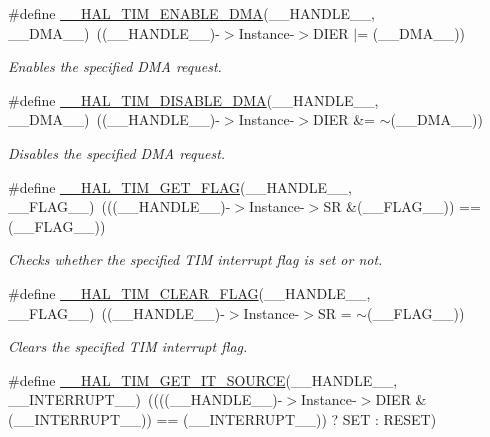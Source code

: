 \begin{DoxyCompactItemize}
\#define \hyperlink{group___t_i_m___exported___macros_gabb91ccd46cd7204c87170a1ea5b38135}{\+\_\+\+\_\+\+H\+A\+L\+\_\+\+T\+I\+M\+\_\+\+E\+N\+A\+B\+L\+E\+\_\+\+D\+MA}(\+\_\+\+\_\+\+H\+A\+N\+D\+L\+E\+\_\+\+\_\+,  \+\_\+\+\_\+\+D\+M\+A\+\_\+\+\_\+)~((\+\_\+\+\_\+\+H\+A\+N\+D\+L\+E\+\_\+\+\_\+)-\/$>$Instance-\/$>$D\+I\+ER $\vert$= (\+\_\+\+\_\+\+D\+M\+A\+\_\+\+\_\+))
\begin{DoxyCompactList}\small\item\em Enables the specified D\+MA request. \end{DoxyCompactList}\item 
\#define \hyperlink{group___t_i_m___exported___macros_ga1a6e8b19efd23fd0295802d904c4702f}{\+\_\+\+\_\+\+H\+A\+L\+\_\+\+T\+I\+M\+\_\+\+D\+I\+S\+A\+B\+L\+E\+\_\+\+D\+MA}(\+\_\+\+\_\+\+H\+A\+N\+D\+L\+E\+\_\+\+\_\+,  \+\_\+\+\_\+\+D\+M\+A\+\_\+\+\_\+)~((\+\_\+\+\_\+\+H\+A\+N\+D\+L\+E\+\_\+\+\_\+)-\/$>$Instance-\/$>$D\+I\+ER \&= $\sim$(\+\_\+\+\_\+\+D\+M\+A\+\_\+\+\_\+))
\begin{DoxyCompactList}\small\item\em Disables the specified D\+MA request. \end{DoxyCompactList}\item 
\#define \hyperlink{group___t_i_m___exported___macros_ga96d98c66ad9d85f00c148de99888ef19}{\+\_\+\+\_\+\+H\+A\+L\+\_\+\+T\+I\+M\+\_\+\+G\+E\+T\+\_\+\+F\+L\+AG}(\+\_\+\+\_\+\+H\+A\+N\+D\+L\+E\+\_\+\+\_\+,  \+\_\+\+\_\+\+F\+L\+A\+G\+\_\+\+\_\+)~(((\+\_\+\+\_\+\+H\+A\+N\+D\+L\+E\+\_\+\+\_\+)-\/$>$Instance-\/$>$SR \&(\+\_\+\+\_\+\+F\+L\+A\+G\+\_\+\+\_\+)) == (\+\_\+\+\_\+\+F\+L\+A\+G\+\_\+\+\_\+))
\begin{DoxyCompactList}\small\item\em Checks whether the specified T\+IM interrupt flag is set or not. \end{DoxyCompactList}\item 
\#define \hyperlink{group___t_i_m___exported___macros_ga2fe74db6b8cb4badd04ed48e0f5ac7b4}{\+\_\+\+\_\+\+H\+A\+L\+\_\+\+T\+I\+M\+\_\+\+C\+L\+E\+A\+R\+\_\+\+F\+L\+AG}(\+\_\+\+\_\+\+H\+A\+N\+D\+L\+E\+\_\+\+\_\+,  \+\_\+\+\_\+\+F\+L\+A\+G\+\_\+\+\_\+)~((\+\_\+\+\_\+\+H\+A\+N\+D\+L\+E\+\_\+\+\_\+)-\/$>$Instance-\/$>$SR = $\sim$(\+\_\+\+\_\+\+F\+L\+A\+G\+\_\+\+\_\+))
\begin{DoxyCompactList}\small\item\em Clears the specified T\+IM interrupt flag. \end{DoxyCompactList}\item 
\#define \hyperlink{group___t_i_m___exported___macros_ga644babf93470a6eee6bce8906c4da5c5}{\+\_\+\+\_\+\+H\+A\+L\+\_\+\+T\+I\+M\+\_\+\+G\+E\+T\+\_\+\+I\+T\+\_\+\+S\+O\+U\+R\+CE}(\+\_\+\+\_\+\+H\+A\+N\+D\+L\+E\+\_\+\+\_\+,  \+\_\+\+\_\+\+I\+N\+T\+E\+R\+R\+U\+P\+T\+\_\+\+\_\+)~((((\+\_\+\+\_\+\+H\+A\+N\+D\+L\+E\+\_\+\+\_\+)-\/$>$Instance-\/$>$D\+I\+ER \& (\+\_\+\+\_\+\+I\+N\+T\+E\+R\+R\+U\+P\+T\+\_\+\+\_\+)) == (\+\_\+\+\_\+\+I\+N\+T\+E\+R\+R\+U\+P\+T\+\_\+\+\_\+)) ? S\+ET \+: R\+E\+S\+ET)

\end{DoxyCompactItemize}
